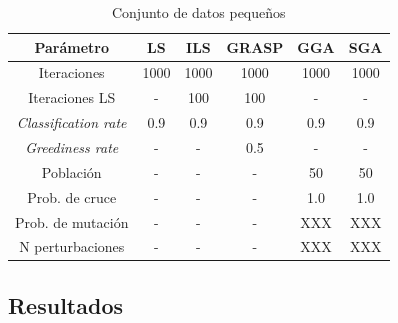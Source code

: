 \documentclass{ci5652}
\begin{document}
\begin{table}[!h]
	\centering
	\begin{tabular}{c c c c c c}
	\hline
	Parámetro & LS & ILS & GRASP & GGA & SGA \\
	\hline
	Iteraciones & 1000 & 1000 & 1000 & 1000 & 1000 \\
	Iteraciones LS & - & 100 & 100 & - & - \\
	\textit{Classification rate} & 0.9 & 0.9 & 0.9 & 0.9 & 0.9 \\
	\textit{Greediness rate} & - & - & 0.5 & - & - \\
	Población & - & - & - & 50 & 50 \\
	Prob. de cruce & - & - & - & 1.0 & 1.0 \\
	Prob. de mutación & - & - & - & XXX & XXX \\
	N perturbaciones & - & - & - & XXX & XXX \\
	\end{tabular}
	\caption{Conjunto de datos pequeños}
	\label{table:parameters}
\end{table}


\subsection{Resultados}

\small



\end{document}
